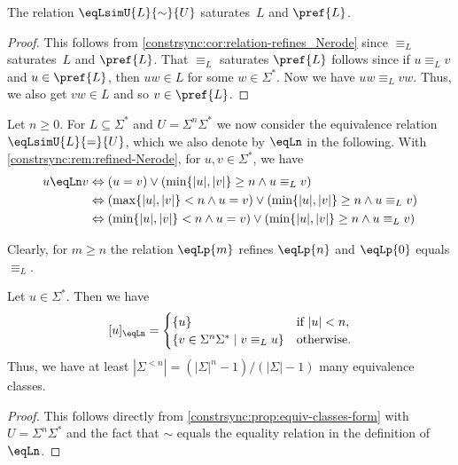 \begin{corollary}  \label{constrsync:cor:both-prefix-L}
	The relation $\eqLsimU{L}{\sim}{U}$
	saturates~$L$ and $\pref{L}$.
\end{corollary}
\begin{proof}
This follows from \cref{constrsync:cor:relation-refines_Nerode} 	
since $\equiv_L$ saturates~$L$
and $\pref{L}$.
That $\equiv_L$ saturates $\pref{L}$
follows since if $u \equiv_L v$
and $u \in \pref{L}$,
then $uw \in L$ for some $w \in \Sigma^*$.
Now we have $uw \equiv_L vw$.
Thus, we also get $vw \in L$
and so $v \in \pref{L}$.
\end{proof}

\label{def:equivLn}
Let $n \ge 0$. For $L \subseteq \Sigma^*$ 
and $U = \Sigma^n \Sigma^*$
we now consider
the equivalence relation $\eqLsimU{L}{=}{U}$,
which we also denote by $\eqLn$ in the following.
With \cref{constrsync:rem:refined-Nerode}, for $u,v \in \Sigma^*$, we have 
\begin{align*} 
u \eqLn v
& \Leftrightarrow 
( u = v )
\lor 
( \min\{ |u|, |v| \} \ge n \land u \equiv_L v ) \\
& \Leftrightarrow 
( \max\{ |u|, |v| \} < n \land u = v )
\lor 
( \min\{ |u|, |v| \} \ge n \land u \equiv_L v ) \\
& \Leftrightarrow 
( \min\{ |u|, |v| \} < n \land u = v   )
\lor 
( \min\{ |u|, |v| \} \ge n \land u \equiv_L v )
\end{align*}

Clearly, for $m \ge n$ the relation 
$\eqLp{m}$ refines $\eqLp{n}$
and $\eqLp{0}$ equals $\equiv_L$.

\begin{proposition} \label{constrsync:prop:eqLn-classes}
Let $u \in \Sigma^*$.
Then we have
\[
[u]_{\eqLn}
=
\begin{cases}
	\{u\} & \text{if } |u| < n, \\
	\{ v \in \Sigma^n\Sigma^* \mid v \equiv_L u \} & \text{otherwise.}
\end{cases}
\]
Thus, we have 
at least $|\Sigma^{< n}| = ( |\Sigma|^n - 1 ) / (|\Sigma| - 1)$
many equivalence classes.
\end{proposition}
\begin{proof}
This follows directly from \cref{constrsync:prop:equiv-classes-form}
with $U = \Sigma^n \Sigma^*$ and the fact that $\sim$
equals the equality relation in the definition of~$\eqLn$.
\end{proof}

